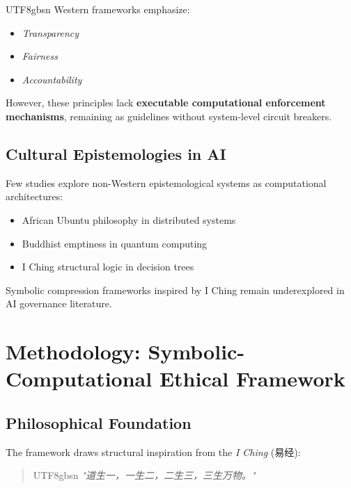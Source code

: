 \documentclass[conference]{IEEEtran}
\begin{document}
\begin{CJK}{UTF8}{gbsn}
Western frameworks emphasize:
\begin{itemize}
    \item \textit{Transparency}~\cite{floridi2019}
    \item \textit{Fairness}~\cite{binns2018}  
    \item \textit{Accountability}~\cite{diakopoulos2016}
\end{itemize}

However, these principles lack \textbf{executable computational enforcement mechanisms}, remaining as guidelines without system-level circuit breakers.

\subsection{Cultural Epistemologies in AI}

Few studies explore non-Western epistemological systems as computational architectures:
\begin{itemize}
    \item African Ubuntu philosophy in distributed systems~\cite{metz2011}
    \item Buddhist emptiness in quantum computing~\cite{zhang2020}
    \item I Ching structural logic in decision trees~\cite{wang2018}
\end{itemize}

Symbolic compression frameworks inspired by I Ching remain underexplored in AI governance literature.

\section{Methodology: Symbolic-Computational Ethical Framework}

\subsection{Philosophical Foundation}

The framework draws structural inspiration from the \textit{I Ching} (易经):

\begin{quote}
\begin{CJK}{UTF8}{gbsn}
\textit{"道生一，一生二，二生三，三生万物。"}
\end{CJK}
\end{quote}


\end{CJK}
\end{document}

